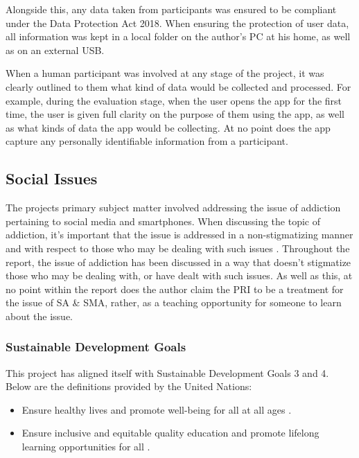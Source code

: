 \documentclass[12pt]{article}
\begin{document}
Alongside this, any data taken from participants was ensured to be compliant under the Data Protection Act 2018. When ensuring the protection of 
user data, all information was kept in a local folder on the author's PC at his home, as well as on an external USB.\newline

When a human participant was involved at any stage of the project, it was clearly outlined to them what kind of data would be collected and
processed. For example, during the evaluation stage, when the user opens the app for the first time, the user is given full clarity on the
purpose of them using the app, as well as what kinds of data the app would be collecting. At no point does the app capture any personally
identifiable information from a participant.

\subsection{Social Issues}
The projects primary subject matter involved addressing the issue of addiction pertaining to social media and smartphones. When discussing
the topic of addiction, it's important that the issue is addressed in a non-stigmatizing manner and with respect to those who may be dealing
with such issues \autocite{nida-addiction, camh-writing-addiction}. Throughout the report, the issue of addiction has been discussed in a way that
doesn't stigmatize those who may be dealing with, or have dealt with such issues. As well as this, at no point within the report does the author 
claim the PRI to be a treatment for the issue of SA \& SMA, rather, as a teaching opportunity for someone to learn about the issue.

\subsubsection{Sustainable Development Goals}
This project has aligned itself with Sustainable Development Goals 3 and 4. Below are the definitions provided by the United Nations:

\begin{itemize}
	\item Ensure healthy lives and promote well-being for all at all ages \autocite{un-sdg-3}.
	\item Ensure inclusive and equitable quality education and promote lifelong learning opportunities for all \autocite{un-sdg-4}.
\end{itemize}
\end{document}
